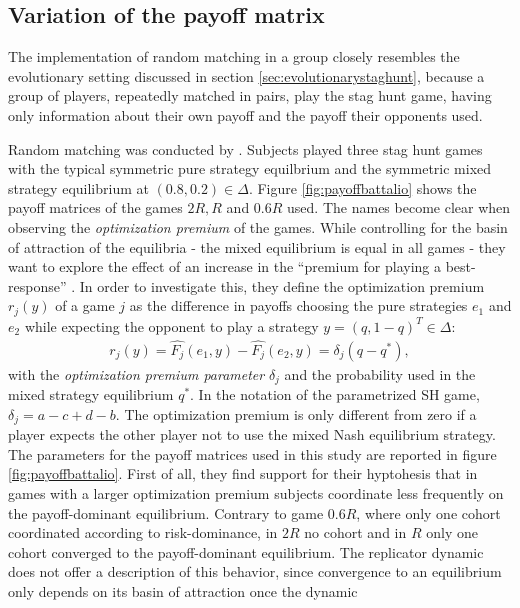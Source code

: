 \subsection{Variation of the payoff matrix}
The implementation of random matching in a group closely resembles the 
evolutionary setting discussed in section \ref{sec:evolutionarystaghunt}, 
because a group of players, repeatedly matched in pairs, play the stag hunt 
game, having only information about their own payoff and the payoff their
opponents used. 

Random matching was conducted by \textcite{battalio_optimization_2001}. 
Subjects played three stag hunt games with the typical symmetric pure strategy
equilbrium and the symmetric mixed strategy equilibrium at $(0.8,0.2) \in
\Delta$. Figure \ref{fig:payoffbattalio} shows the payoff matrices of the
games $2R, R$ and $0.6R$ used. The names become clear when observing the 
\textit{optimization premium} of the games. While controlling for the basin of 
attraction of the equilibria - the mixed equilibrium is equal in all games -
they want to explore the effect of an increase in the ``premium for playing
a best-response'' \parencite[751]{battalio_optimization_2001}. 
In order to investigate this, they define the optimization premium $r_j(y)$ of 
a game $j$ as the difference in payoffs choosing the pure strategies 
$e_1$ and $e_2$ while expecting the opponent to play a strategy 
$y=(q,1-q)^T \in \Delta$:
\begin{align}
        r_j(y)= \hat{F_j}(e_1,y) - \hat{F_j}(e_2,y) = \delta_j(q-q^*),
\end{align}
with the \textit{optimization premium parameter} $\delta_j$ and the 
probability used in the mixed strategy equilibrium $q^*$. In the notation
of the parametrized SH game, $\delta_j = a - c + d - b$. The optimization
premium is only different from zero if a player expects the other player not
to use the mixed Nash equilibrium strategy.
The parameters for the payoff matrices used in this study 
are reported in figure \ref{fig:payoffbattalio}. 
First of all, they find support for their hyptohesis that in games with a 
larger optimization premium subjects coordinate less frequently on the 
payoff-dominant equilibrium. 
Contrary to game $0.6R$, where only one cohort coordinated according 
to risk-dominance, in $2R$ no cohort and in $R$ only one cohort 
converged to the payoff-dominant equilibrium. The replicator dynamic does 
not offer a description of this behavior, since convergence to an 
equilibrium only depends on its basin of attraction once the dynamic 
